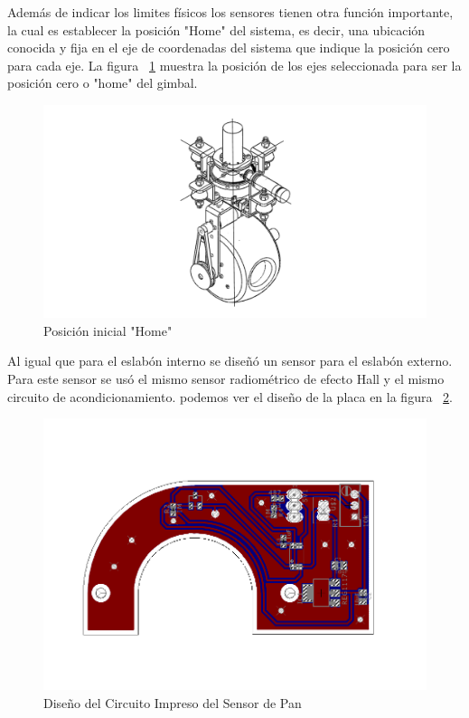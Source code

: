 Adem\'{a}s de indicar los limites f\'{i}sicos los sensores tienen otra funci\'{o}n importante, la cual es establecer la posici\'{o}n "Home" del sistema, es decir, una ubicaci\'{o}n conocida y fija en el eje de coordenadas del sistema que indique la posici\'{o}n cero para cada eje. La figura ~\ref{fig:HomePos} muestra la posici\'{o}n de los ejes seleccionada para ser la posici\'{o}n cero o "home" del gimbal. 

\begin{figure}[H]
\centering \includegraphics[scale=0.5,trim = 40mm 10mm 40mm 5mm]{img/HomePos.pdf}
\caption{Posici\'{o}n inicial "Home"}
\label{fig:HomePos}
\end{figure}

Al igual que para el eslab\'{o}n interno se dise\~{n}\'{o} un sensor para el eslab\'{o}n externo. Para este sensor se us\'{o} el mismo sensor radiom\'{e}trico de efecto Hall y el mismo circuito de acondicionamiento. podemos ver el dise\~{n}o de la placa en la figura ~\ref{fig:CircuitoImpPan}.

\begin{figure}[H]
\centering \includegraphics[scale=0.7,trim = 0mm 25mm 0mm 20mm]{img/LimitSW_Pan.pdf}
\caption{Dise\~{n}o del Circuito Impreso del Sensor de Pan}
\label{fig:CircuitoImpPan}
\end{figure}

